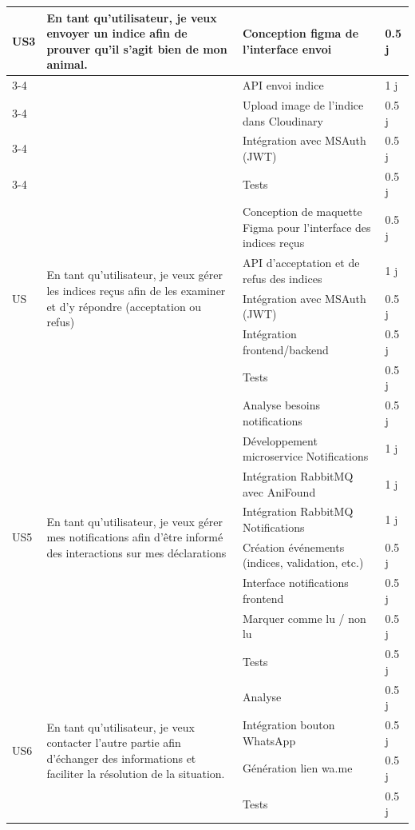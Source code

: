 \begin{longtable}{|p{2cm}|p{5cm}|p{6cm}|p{2cm}|}
\multirow{6}{2cm}{US3}
& \multirow{6}{5cm}{En tant qu’utilisateur, je veux envoyer un indice afin de prouver qu’il s’agit bien de mon animal.}
& Conception figma de l'interface envoi & 0.5 j \\
\cline{3-4}
& & API envoi indice & 1 j \\
\cline{3-4}
& & Upload image de l'indice dans Cloudinary & 0.5 j \\
\cline{3-4}
& & Intégration avec MSAuth (JWT) & 0.5 j \\
\cline{3-4}
& & Tests & 0.5 j \\
\hline

\multirow{5}{2cm}{US}
& \multirow{5}{5cm}{En tant qu’utilisateur, je veux gérer les indices reçus afin de les examiner et d’y répondre (acceptation ou refus)}
 & Conception de maquette Figma pour l'interface des indices reçus & 0.5 j \\
\cline{3-4}
& & API d’acceptation et de refus des indices & 1 j \\
\cline{3-4}
& & Intégration avec MSAuth (JWT)  & 0.5 j \\
\cline{3-4} 
& & Intégration frontend/backend   & 0.5 j \\
\cline{3-4} 
& & Tests & 0.5 j \\
\hline

\multirow{8}{2cm}{US5}
& \multirow{8}{5cm}{En tant qu’utilisateur, je veux gérer mes notifications afin d’être informé des interactions sur mes déclarations}
& Analyse besoins notifications & 0.5 j \\
\cline{3-4}
& & Développement microservice Notifications & 1 j \\
\cline{3-4}
& & Intégration RabbitMQ avec AniFound & 1 j \\
\cline{3-4}
& & Intégration RabbitMQ Notifications & 1 j \\
\cline{3-4}
& & Création événements (indices, validation, etc.) & 0.5 j \\
\cline{3-4}
& & Interface notifications frontend & 0.5 j \\
\cline{3-4}
& & Marquer comme lu / non lu & 0.5 j \\
\cline{3-4}
& & Tests & 0.5 j \\
\hline

\multirow{4}{2cm}{US6}
& \multirow{4}{5cm}{En tant qu’utilisateur, je veux contacter l’autre partie afin d’échanger des informations et faciliter la résolution de la situation.}
& Analyse & 0.5 j \\
\cline{3-4}
& & Intégration bouton WhatsApp & 0.5 j \\
\cline{3-4}
& & Génération lien wa.me & 0.5 j \\
\cline{3-4}
& & Tests & 0.5 j \\
\hline

\end{longtable}
\newpage 

